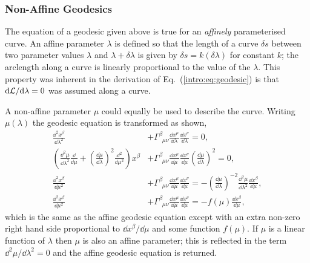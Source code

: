 \subsubsection*{Non-Affine Geodesics}
The equation of a geodesic given above is true for an {\it affinely} parameterised curve. An affine parameter $\lambda$ is defined so that the length of a curve $\delta s$ between two parameter values $\lambda$ and $\lambda+\delta \lambda$ is given by $\delta s = k (\delta \lambda)$ for constant $k$; the arclength along a curve is linearly proportional to the value of the $\lambda$. This property was inherent in the derivation of Eq.~(\ref{intro:eq:geodesic}) is that $\dd \mathcal{L} / \dd \lambda=0$ was assumed along a curve.

A non-affine parameter $\mu$ could equally be used to describe the curve. Writing $\mu(\lambda)$ the geodesic equation is transformed as shown,
\begin{align}
\frac{\dd ^2 {x}^\beta}{\dd \lambda^2} &+ \Gamma^\beta_{\,\,\,\mu\nu}\frac{\dd {x}^\mu}{\dd \lambda}\frac{\dd {x}^\nu}{\dd \lambda}=0,\\
\left(  \frac{\dd^2 \mu}{\dd \lambda^2} \frac{\dd}{\dd\mu}  + \left( \frac{\dd \mu}{\dd \lambda} \right)^2 \frac{\dd^2}{\dd \mu^2} \right) {x}^\beta     &+ \Gamma^\beta_{\,\,\,\mu\nu}\frac{\dd {x}^\mu}{\dd \mu}\frac{\dd {x}^\nu}{\dd \mu}\left( \frac{\dd \mu}{\dd \lambda} \right)^2=0,\\
    \frac{\dd^2 {x}^\beta }{\dd \mu^2}     &+ \Gamma^\beta_{\,\,\,\mu\nu}\frac{\dd {x}^\mu}{\dd \mu}\frac{\dd {x}^\nu}{\dd \mu}=- \left( \frac{\dd \mu}{\dd \lambda} \right)^{-2}\frac{\dd^2\mu}{\dd \lambda^2} \frac{\dd x^\beta}{\dd\mu},\\
    \frac{\dd^2 {x}^\beta }{\dd \mu^2}     &+ \Gamma^\beta_{\,\,\,\mu\nu}\frac{\dd {x}^\mu}{\dd \mu}\frac{\dd {x}^\nu}{\dd \mu}=- f(\mu) \frac{\dd x^\beta}{\dd\mu},
\end{align}
which is the same as the affine geodesic equation except with an extra non-zero right hand side proportional to $\dd x^\beta/\dd \mu$ and some function $f(\mu)$. If $\mu$ is a linear function of $\lambda$ then $\mu$ is also an affine parameter; this is reflected in the term $\dd^2 \mu / \dd \lambda^2=0$ and the affine geodesic equation is returned.

